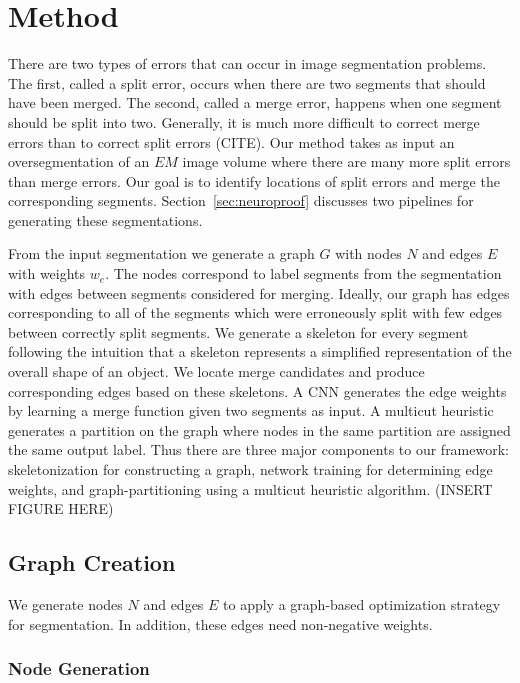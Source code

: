 \section{Method}

There are two types of errors that can occur in image segmentation problems.
The first, called a split error, occurs when there are two segments that should have been merged.
The second, called a merge error, happens when one segment should be split into two.
Generally, it is much more difficult to correct merge errors than to correct split errors (CITE). 
Our method takes as input an oversegmentation of an $EM$ image volume where there are many more split errors than merge errors.
Our goal is to identify locations of split errors and merge the corresponding segments.
Section~\ref{sec:neuroproof} discusses two pipelines for generating these segmentations.

From the input segmentation we generate a graph $G$ with nodes $N$ and edges $E$ with weights $w_e$. 
The nodes correspond to label segments from the segmentation with edges between segments considered for merging.
Ideally, our graph has edges corresponding to all of the segments which were erroneously split with few edges between correctly split segments.
We generate a skeleton for every segment following the intuition that a skeleton represents a simplified representation of the overall shape of an object. 
We locate merge candidates and produce corresponding edges based on these skeletons.
A CNN generates the edge weights by learning a merge function given two segments as input. 
A multicut heuristic generates a partition on the graph where nodes in the same partition are assigned the same output label. 
Thus there are three major components to our framework: skeletonization for constructing a graph, network training for determining edge weights, and graph-partitioning using a multicut heuristic algorithm. (INSERT FIGURE HERE)

\subsection{Graph Creation}

We generate nodes $N$ and edges $E$ to apply a graph-based optimization strategy for segmentation. 
In addition, these edges need non-negative weights.

\subsubsection{Node Generation}

